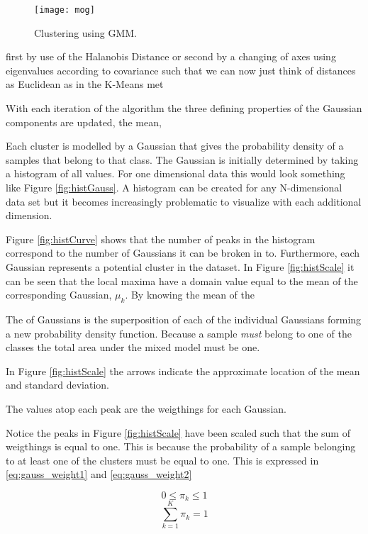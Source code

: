 \begin{figure}[H]
	\centering
	\centering\texttt{[image: mog]}
	\caption{Clustering using GMM.}
	\label{fig:mogcov}
\end{figure}
  
first by use of the Halanobis Distance or second by a changing of axes using eigenvalues according to covariance such that we can now just think of distances as Euclidean as in the K-Means met

With each iteration of the algorithm the three defining properties of the Gaussian components are updated, the mean, 

Each cluster is modelled by a Gaussian that gives the probability density of a samples that belong to that class. The Gaussian is initially determined by taking a histogram of all values. For one dimensional data this would look something like Figure \ref{fig:histGauss}. A histogram can be created for any N-dimensional data set but it becomes increasingly problematic to visualize with each additional dimension.



Figure \ref{fig:histCurve} shows that the number of peaks in the histogram correspond to the number of Gaussians it can be broken in to. Furthermore, each Gaussian represents a potential cluster in the dataset. In Figure \ref{fig:histScale} it can be seen that the local maxima have a domain value equal to the mean of the corresponding Gaussian, $\mu_k$. By knowing the mean of the

The  of Gaussians is the superposition of each of the individual Gaussians forming a new probability density function. Because a sample \emph{must} belong to one of the classes the total area under the mixed model must be one. 

In Figure \ref{fig:histScale} the arrows indicate the approximate location of the mean and standard deviation. 

The values atop each peak are the weigthings for each Gaussian.


Notice the peaks in Figure \ref{fig:histScale} have been scaled such that the sum of weigthings is equal to one. This is because the probability of a sample belonging to at least one of the clusters must be equal to one. This is expressed in \ref{eq:gauss_weight1} and \ref{eq:gauss_weight2}

\begin{equation}
    0\leq \pi_k \leq 1
\label{eq:gauss_weight1}
\end{equation}
\begin{equation}
    \sum_{k=1}^{K}\pi_k = 1
\label{eq:gauss_weight2}
\end{equation}






